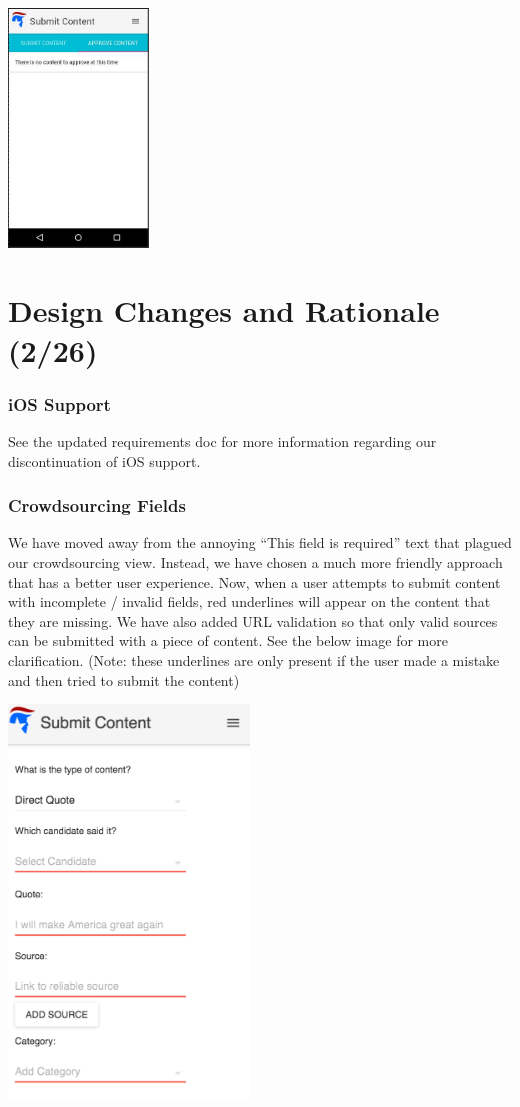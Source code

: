 \documentclass[11pt]{article}
\begin{document}
\begin{centering}
    \includegraphics[width=0.28\textwidth]{1.jpg}

\end{centering}

\section{Design Changes and Rationale (2/26)}

\subsubsection{iOS Support}

See the updated requirements doc for more information regarding our discontinuation of iOS support.

\subsubsection{Crowdsourcing Fields}

We have moved away from the annoying ``This field is required'' text that plagued our crowdsourcing view. Instead, we have chosen a much more friendly approach that has a better user experience. Now, when a user attempts to submit content with incomplete / invalid fields, red underlines will appear on the content that they are missing. We have also added URL validation so that only valid sources can be submitted with a piece of content. See the below image for more clarification. (Note: these underlines are only present if the user made a mistake and then tried to submit the content)\\

\begin{centering}
    \includegraphics[width=0.48\textwidth]{underline.png}

\end{centering}
\end{document}
